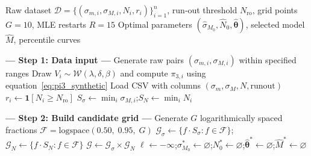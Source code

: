 \begin{algorithm}[htbp]
\caption{Fitting algorithm for the Weibull–Hyperbola model with joint estimation of \(\sigma_{M_0}\) and \(N_0\)}
\label{alg:whm}
\begin{algorithmic}[1]
\Require Raw dataset $\mathcal{D}=\{(\sigma_{m,i},\sigma_{M,i},N_i,r_i)\}_{i=1}^{n}$, run‑out threshold $N_{\mathrm{ro}}$, grid points $G=10$, MLE restarts $R=15$
\Ensure Optimal parameters $(\hat{\sigma}_{M_0},\hat{N}_0,\hat{\boldsymbol{\theta}})$, selected model $\hat{M}$, percentile curves

\Statex \textbf{--- Step 1: Data input ---}
  \State Generate raw pairs $(\sigma_{m,i},\sigma_{M,i})$ within specified ranges
  \State Draw $V_i\sim\mathcal{W}(\lambda,\delta,\beta)$ and compute $\pi_{3,i}$ using equation~\eqref{eq:pi3_synthetic}
\Else
  \State Load CSV with columns $(\sigma_m,\sigma_M,N,\text{runout})$
  \State $r_i\leftarrow\mathbf{1}[N_i\ge N_{\mathrm{ro}}]$
\EndIf
\State $S_\sigma\leftarrow\min_i\sigma_{M,i}$;\quad $S_N\leftarrow\min_i N_i$

\Statex \textbf{--- Step 2: Build candidate grid ---}
\State Generate $G$ logarithmically spaced fractions $\mathcal{F}=\mathrm{logspace}(0.50,\;0.95,\;G)$
\State $\mathcal{G}_\sigma\leftarrow\{f\cdot S_\sigma:f\in\mathcal{F}\}$;\quad $\mathcal{G}_N\leftarrow\{f\cdot S_N:f\in\mathcal{F}\}$
\State $\mathcal{G}\leftarrow\mathcal{G}_\sigma\times\mathcal{G}_N$ \hfill{}
\State $\ell^{}\leftarrow-\infty$;\quad $\sigma_{M_0}^*\leftarrow\varnothing$;\quad $N_0^*\leftarrow\varnothing$;\quad $\hat{\boldsymbol{\theta}}^*\leftarrow\varnothing$;\quad $\hat{M}^*\leftarrow\varnothing$


\end{algorithmic}
\end{algorithm}
